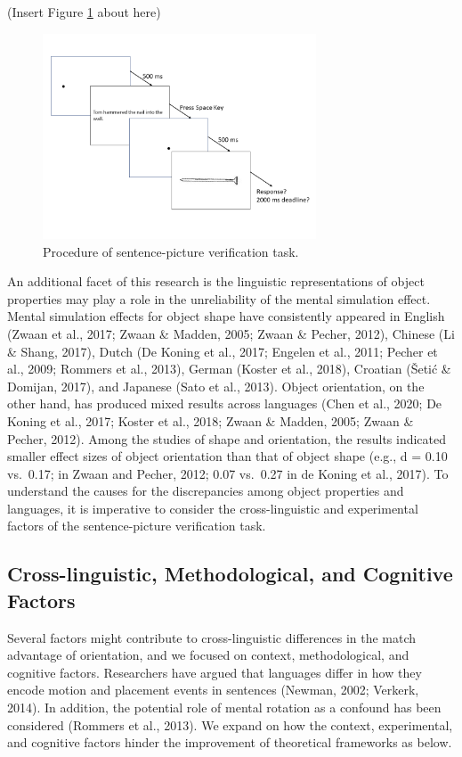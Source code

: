 \documentclass[
  man]{apa7}
\begin{document}
(Insert Figure \ref{fig:fig01} about here)

\begin{figure}
\includegraphics[width=3.2in]{includes/fig/fig2a} \caption{Procedure of sentence-picture verification task.}\label{fig:fig01}
\end{figure}

An additional facet of this research is the linguistic representations of object properties may play a role in the unreliability of the mental simulation effect. Mental simulation effects for object shape have consistently appeared in English (Zwaan et al., 2017; Zwaan \& Madden, 2005; Zwaan \& Pecher, 2012), Chinese (Li \& Shang, 2017), Dutch (De Koning et al., 2017; Engelen et al., 2011; Pecher et al., 2009; Rommers et al., 2013), German (Koster et al., 2018), Croatian (Šetić \& Domijan, 2017), and Japanese (Sato et al., 2013). Object orientation, on the other hand, has produced mixed results across languages (Chen et al., 2020; De Koning et al., 2017; Koster et al., 2018; Zwaan \& Madden, 2005; Zwaan \& Pecher, 2012). Among the studies of shape and orientation, the results indicated smaller effect sizes of object orientation than that of object shape (e.g., d = 0.10 vs.~0.17; in Zwaan and Pecher, 2012; 0.07 vs.~0.27 in de Koning et al., 2017). To understand the causes for the discrepancies among object properties and languages, it is imperative to consider the cross-linguistic and experimental factors of the sentence-picture verification task.

\hypertarget{cross-linguistic-methodological-and-cognitive-factors}{%
\subsection{Cross-linguistic, Methodological, and Cognitive Factors}\label{cross-linguistic-methodological-and-cognitive-factors}}

Several factors might contribute to cross-linguistic differences in the match advantage of orientation, and we focused on context, methodological, and cognitive factors. Researchers have argued that languages differ in how they encode motion and placement events in sentences (Newman, 2002; Verkerk, 2014). In addition, the potential role of mental rotation as a confound has been considered (Rommers et al., 2013). We expand on how the context, experimental, and cognitive factors hinder the improvement of theoretical frameworks as below.
\end{document}
